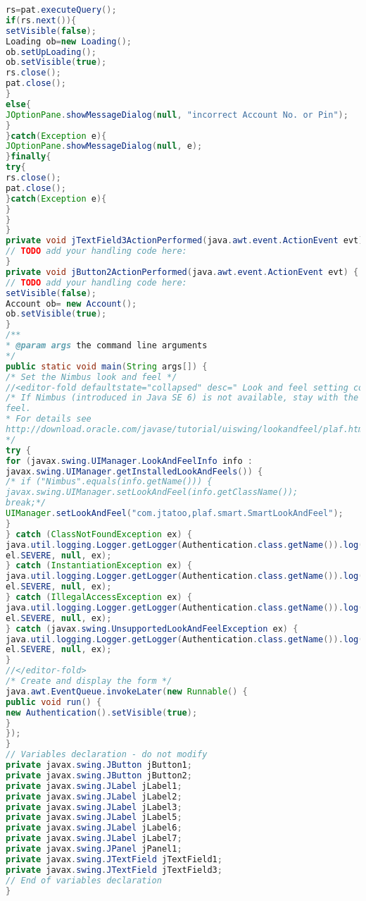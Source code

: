 \begin{lstlisting}[language=Java]
rs=pat.executeQuery();
if(rs.next()){
setVisible(false);
Loading ob=new Loading();
ob.setUpLoading();
ob.setVisible(true);
rs.close();
pat.close();
}
else{
JOptionPane.showMessageDialog(null, "incorrect Account No. or Pin");
}
}catch(Exception e){
JOptionPane.showMessageDialog(null, e);
}finally{
try{
rs.close();
pat.close();
}catch(Exception e){
}
}
}
private void jTextField3ActionPerformed(java.awt.event.ActionEvent evt) {
// TODO add your handling code here:
}
private void jButton2ActionPerformed(java.awt.event.ActionEvent evt) {
// TODO add your handling code here:
setVisible(false);
Account ob= new Account();
ob.setVisible(true);
}
/**
* @param args the command line arguments
*/
public static void main(String args[]) {
/* Set the Nimbus look and feel */
//<editor-fold defaultstate="collapsed" desc=" Look and feel setting code (optional) ">
/* If Nimbus (introduced in Java SE 6) is not available, stay with the default look and
feel.
* For details see
http://download.oracle.com/javase/tutorial/uiswing/lookandfeel/plaf.html
*/
try {
for (javax.swing.UIManager.LookAndFeelInfo info :
javax.swing.UIManager.getInstalledLookAndFeels()) {
/* if ("Nimbus".equals(info.getName())) {
javax.swing.UIManager.setLookAndFeel(info.getClassName());
break;*/
UIManager.setLookAndFeel("com.jtatoo,plaf.smart.SmartLookAndFeel");
}
} catch (ClassNotFoundException ex) {
java.util.logging.Logger.getLogger(Authentication.class.getName()).log(java.util.logging.Lev
el.SEVERE, null, ex);
} catch (InstantiationException ex) {
java.util.logging.Logger.getLogger(Authentication.class.getName()).log(java.util.logging.Lev
el.SEVERE, null, ex);
} catch (IllegalAccessException ex) {
java.util.logging.Logger.getLogger(Authentication.class.getName()).log(java.util.logging.Lev
el.SEVERE, null, ex);
} catch (javax.swing.UnsupportedLookAndFeelException ex) {
java.util.logging.Logger.getLogger(Authentication.class.getName()).log(java.util.logging.Lev
el.SEVERE, null, ex);
}
//</editor-fold>
/* Create and display the form */
java.awt.EventQueue.invokeLater(new Runnable() {
public void run() {
new Authentication().setVisible(true);
}
});
}
// Variables declaration - do not modify
private javax.swing.JButton jButton1;
private javax.swing.JButton jButton2;
private javax.swing.JLabel jLabel1;
private javax.swing.JLabel jLabel2;
private javax.swing.JLabel jLabel3;
private javax.swing.JLabel jLabel5;
private javax.swing.JLabel jLabel6;
private javax.swing.JLabel jLabel7;
private javax.swing.JPanel jPanel1;
private javax.swing.JTextField jTextField1;
private javax.swing.JTextField jTextField3;
// End of variables declaration
}
\end{lstlisting}
